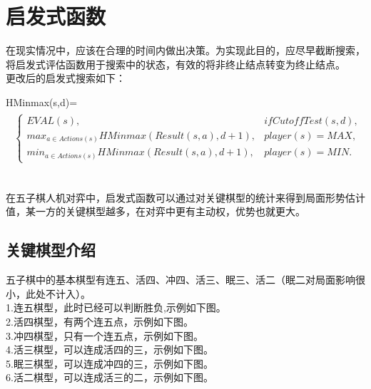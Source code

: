 \documentclass{acm_proc_article-sp}
\begin{document}
\section{启发式函数}
在现实情况中，应该在合理的时间内做出决策。为实现此目的，应尽早截断搜索，将启发式评估函数用于搜索中的状态，有效的将非终止结点转变为终止结点。\\
更改后的启发式搜索如下：\\
\begin{tiny}
HMinmax(s,d)=\\
\begin{equation}
\begin{split}
\begin{aligned}
\left\{
\begin{array}{lr} 
EVAL(s),& if CutoffTest(s,d), \\
max_{a\in Actions(s)}HMinmax(Result(s,a),d+1) , & player(s)=MAX,\\
min_{a\in Actions(s)}HMinmax(Result(s,a),d+1), & player(s)=MIN.
\end{array}
\right.
\end{aligned}
\end{split}
\end{equation}
\end{tiny}
\\
在五子棋人机对弈中，启发式函数可以通过对关键棋型的统计来得到局面形势估计值，某一方的关键棋型越多，在对弈中更有主动权，优势也就更大。\\
\subsection{关键棋型介绍}
五子棋中的基本棋型有连五、活四、冲四、活三、眠三、活二（眠二对局面影响很小，此处不计入）。\\
1.连五棋型，此时已经可以判断胜负,示例如下图。\\
2.活四棋型，有两个连五点，示例如下图。\\
3.冲四棋型，只有一个连五点，示例如下图。\\
4.活三棋型，可以连成活四的三，示例如下图。\\
5.眠三棋型，可以连成冲四的三，示例如下图。\\
6.活二棋型，可以连成活三的二，示例如下图。\\
\end{document}
